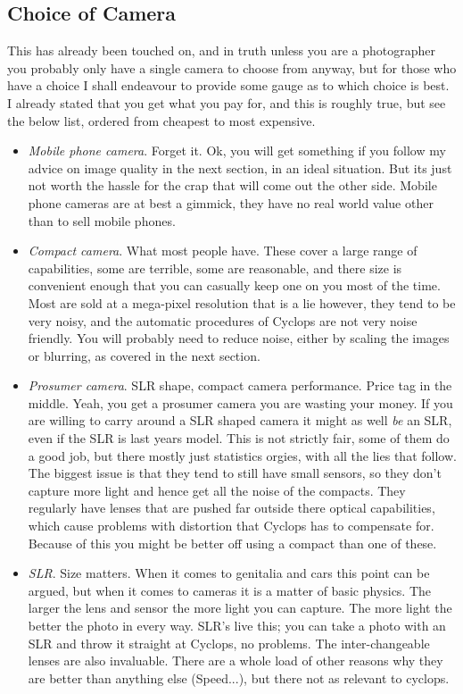 \documentclass[10pt,a4paper,twoside]{article}
\begin{document}
\subsection{Choice of Camera}
This has already been touched on, and in truth unless you are a photographer you probably only have a single camera to choose from anyway, but for those who have a choice I shall endeavour to provide some gauge as to which choice is best.
I already stated that you get what you pay for, and this is roughly true, but see the below list, ordered from cheapest to most expensive.
\begin{itemize}
\item \emph{Mobile phone camera}. Forget it. Ok, you will get something if you follow my advice on image quality in the next section, in an ideal situation. But its just not worth the hassle for the crap that will come out the other side. Mobile phone cameras are at best a gimmick, they have no real world value other than to sell mobile phones.

\item \emph{Compact camera}. What most people have. These cover a large range of capabilities, some are terrible, some are reasonable, and there size is convenient enough that you can casually keep one on you most of the time. Most are sold at a mega-pixel resolution that is a lie however, they tend to be very noisy, and the automatic procedures of Cyclops are not very noise friendly. You will probably need to reduce noise, either by scaling the images or blurring, as covered in the next section.

\item \emph{Prosumer camera}. SLR shape, compact camera performance. Price tag in the middle. Yeah, you get a prosumer camera you are wasting your money. If you are willing to carry around a SLR shaped camera it might as well \emph{be} an SLR, even if the SLR is last years model. This is not strictly fair, some of them do a good job, but there mostly just statistics orgies, with all the lies that follow. The biggest issue is that they tend to still have small sensors, so they don't capture more light and hence get all the noise of the compacts. They regularly have lenses that are pushed far outside there optical capabilities, which cause problems with distortion that Cyclops has to compensate for. Because of this you might be better off using a compact than one of these.

\item \emph{SLR}. Size matters. When it comes to genitalia and cars this point can be argued, but when it comes to cameras it is a matter of basic physics. The larger the lens and sensor the more light you can capture. The more light the better the photo in every way. SLR's live this; you can take a photo with an SLR and throw it straight at Cyclops, no problems. The inter-changeable lenses are also invaluable. There are a whole load of other reasons why they are better than anything else (Speed...), but there not as relevant to cyclops.
\end{itemize}
\end{document}
